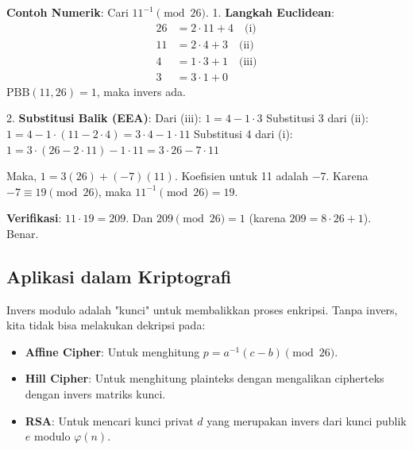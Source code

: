 \textbf{Contoh Numerik}: Cari $11^{-1} \pmod{26}$.
1. \textbf{Langkah Euclidean}:
\begin{align*}
    26 &= 2 \cdot 11 + 4 \quad \text{(i)} \\
    11 &= 2 \cdot 4 + 3 \quad \text{(ii)} \\
    4 &= 1 \cdot 3 + 1 \quad \text{(iii)} \\
    3 &= 3 \cdot 1 + 0
\end{align*}
$\text{PBB}(11, 26) = 1$, maka invers ada.

2. \textbf{Substitusi Balik (EEA)}:
Dari (iii): $1 = 4 - 1 \cdot 3$
Substitusi 3 dari (ii): $1 = 4 - 1 \cdot (11 - 2 \cdot 4) = 3 \cdot 4 - 1 \cdot 11$
Substitusi 4 dari (i): $1 = 3 \cdot (26 - 2 \cdot 11) - 1 \cdot 11 = 3 \cdot 26 - 7 \cdot 11$

Maka, $1 = 3(26) + (-7)(11)$.
Koefisien untuk 11 adalah $-7$.
Karena $-7 \equiv 19 \pmod{26}$, maka $11^{-1} \pmod{26} = 19$.

\textbf{Verifikasi}: $11 \cdot 19 = 209$. Dan $209 \pmod{26} = 1$ (karena $209 = 8 \cdot 26 + 1$). Benar.

\subsection{Aplikasi dalam Kriptografi}

Invers modulo adalah "kunci" untuk membalikkan proses enkripsi. Tanpa invers, kita tidak bisa melakukan dekripsi pada:
\begin{itemize}
    \item \textbf{Affine Cipher}: Untuk menghitung $p = a^{-1}(c - b) \pmod{26}$.
    \item \textbf{Hill Cipher}: Untuk menghitung plainteks dengan mengalikan cipherteks dengan invers matriks kunci.
    \item \textbf{RSA}: Untuk mencari kunci privat $d$ yang merupakan invers dari kunci publik $e$ modulo $\varphi(n)$.
\end{itemize}
